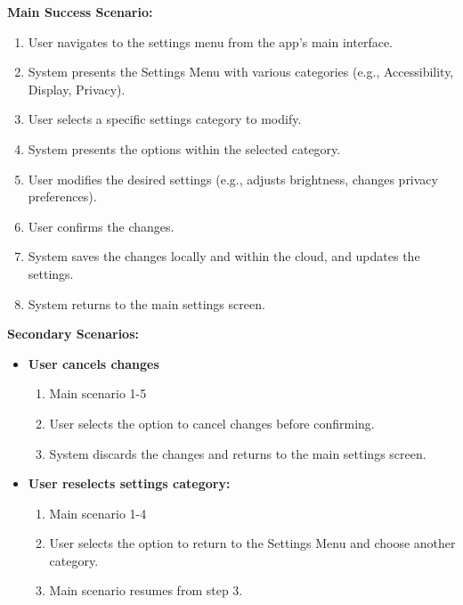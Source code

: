 \documentclass{article}
\begin{document}
\begin{enumerate}[label=\textbf{UC\arabic*}]
          \textbf{Main Success Scenario:}
          \begin{enumerate}[label=\textbf{\arabic*.}]
              \item User navigates to the settings menu from the app’s main interface.
              \item System presents the Settings Menu with various categories (e.g., Accessibility, Display, Privacy).
              \item User selects a specific settings category to modify.
              \item System presents the options within the selected category.
              \item User modifies the desired settings (e.g., adjusts brightness, changes privacy preferences).
              \item User confirms the changes.
              \item System saves the changes locally and within the cloud, and updates the settings.
              \item System returns to the main settings screen.
          \end{enumerate}

          \textbf{Secondary Scenarios:}
          \begin{itemize}
              \item[{}] \textbf{User cancels changes}
                    \begin{enumerate}[label=\textbf{\arabic*.}]
                        \item Main scenario 1-5
                        \item User selects the option to cancel changes before confirming.
                        \item System discards the changes and returns to the main settings screen.
                    \end{enumerate}

              \item[{}] \textbf{User reselects settings category:}
                    \begin{enumerate}[label=\textbf{\arabic*.}]
                        \item Main scenario 1-4
                        \item User selects the option to return to the Settings Menu and choose another category.
                        \item Main scenario resumes from step 3.
                    \end{enumerate}


\end{itemize}
\end{enumerate}
\end{document}
